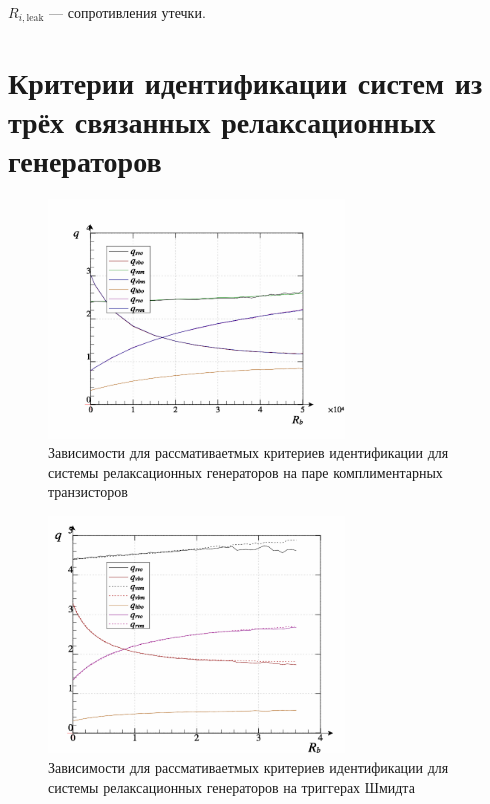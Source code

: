 $R_{i,\mathrm{leak}}$ --- сопротивления утечки.



\section{Критерии идентификации систем из трёх связанных релаксационных генераторов}

\begin{figure}[htb!]
  \centerline{\includegraphics[width=0.7\textwidth]{p/relax3_read_q-p_q1.png} }
  \caption{Зависимости для рассмативаетмых критериев идентификации для системы релаксационных генераторов на паре комплиментарных транзисторов}
  \label{atu:f:relax3d_q}
\end{figure}

\begin{figure}[htb!]
  \centerline{\includegraphics[width=0.7\textwidth]{p/relax3ds_read_q-p_q1.png} }
  \caption{Зависимости для рассмативаетмых критериев идентификации для системы релаксационных генераторов на триггерах Шмидта}
  \label{atu:f:relax3ds_q}
\end{figure}

